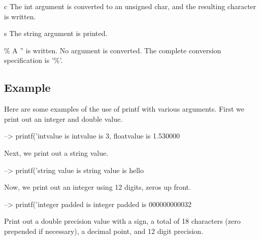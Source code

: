 \begin{DoxyItemize}
\item {\ttfamily c} The int argument is converted to an unsigned char, and the resulting character is written.  
\item {\ttfamily s} The string argument is printed.  
\item {\ttfamily \%} A {\ttfamily ''} is written. No argument is converted. The complete conversion specification is {\ttfamily '\%'}.  
\end{DoxyItemize}\hypertarget{variables_struct_Example}{}\subsection{Example}\label{variables_struct_Example}
Here are some examples of the use of {\ttfamily printf} with various arguments. First we print out an integer and double value.


\begin{DoxyVerbInclude}
--> printf('intvalue is %
intvalue is 3, floatvalue is 1.530000
\end{DoxyVerbInclude}


Next, we print out a string value.


\begin{DoxyVerbInclude}
--> printf('string value is %
string value is hello
\end{DoxyVerbInclude}


Now, we print out an integer using 12 digits, zeros up front.


\begin{DoxyVerbInclude}
--> printf('integer padded is %
integer padded is 000000000032
\end{DoxyVerbInclude}


Print out a double precision value with a sign, a total of 18 characters (zero prepended if necessary), a decimal point, and 12 digit precision.


